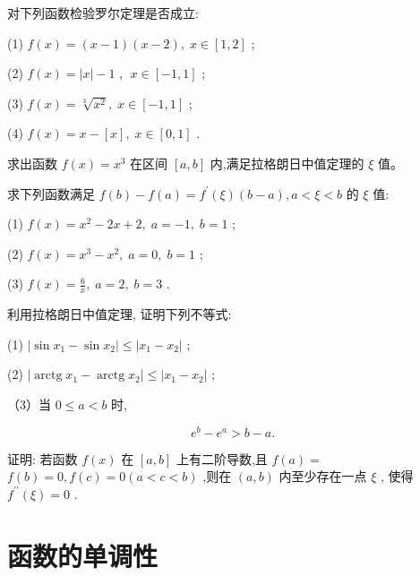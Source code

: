 \documentclass[lang=cn,newtx,12pt,scheme=chinese]{elegantbook}
\begin{document}
\begin{problemset}[习 题 九]

\item 对下列函数检验罗尔定理是否成立:

(1) \(f\left( x\right) = \left( {x - 1}\right) \left( {x - 2}\right) ,\;x \in \left\lbrack {1,2}\right\rbrack\) ;

(2) \(f\left( x\right) = \left| x\right| - 1\) , \(\;x \in \left\lbrack {-1,1}\right\rbrack\) ;

(3) \(f\left( x\right) = \sqrt[3]{{x}^{2}},\;x \in \left\lbrack {-1,1}\right\rbrack\) ;

(4) \(f\left( x\right) = x - \left\lbrack x\right\rbrack ,\;x \in \left\lbrack {0,1}\right\rbrack\) .

\item 求出函数 \(f\left( x\right) = {x}^{3}\) 在区间 \(\left\lbrack {a,b}\right\rbrack\) 内,满足拉格朗日中值定理的 \(\xi\) 值。

\item 求下列函数满足 \(f\left( b\right) - f\left( a\right) = {f}^{\prime }\left( \xi \right) \left( {b - a}\right) ,a < \xi < b\) 的 \(\xi\) 值:

(1) \(f\left( x\right) = {x}^{2} - {2x} + 2,\;a = - 1,\;b = 1\) ;

(2) \(f\left( x\right) = {x}^{3} - {x}^{2},\;a = 0,\;b = 1\) ;

(3) \(f\left( x\right) = \frac{6}{x},\;a = 2,\;b = 3\) .

\item 利用拉格朗日中值定理, 证明下列不等式:

(1) \(\left| {\sin {x}_{1} - \sin {x}_{2}}\right| \leq \left| {{x}_{1} - {x}_{2}}\right|\) ;

(2) \(\left| {\operatorname{arctg}{x}_{1} - \operatorname{arctg}{x}_{2}}\right| \leq \left| {{x}_{1} - {x}_{2}}\right|\) ;

（3）当 \(0 \leq a < b\) 时,

\[
{e}^{b} - {e}^{a} > b - a.
\]

\item 证明: 若函数 \(f\left( x\right)\) 在 \(\left\lbrack {a,b}\right\rbrack\) 上有二阶导数,且 \(f\left( a\right) =\) \(f\left( b\right) = 0,f\left( c\right) = 0\left( {a < c < b}\right)\) ,则在 \(\left( {a,b}\right)\) 内至少存在一点 \(\xi\) , 使得 \({f}^{\prime \prime }\left( \xi \right) = 0\) .

\end{problemset}

\section{函数的单调性}
\end{document}
